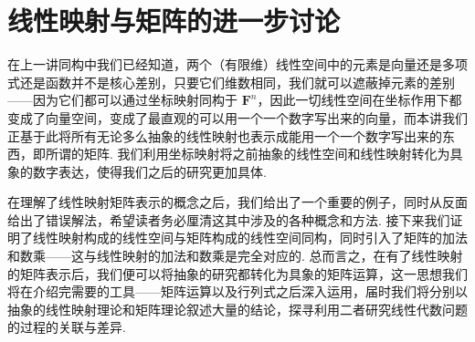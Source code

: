 \section{线性映射与矩阵的进一步讨论}

\begin{summary}

    在上一讲同构中我们已经知道，两个（有限维）线性空间中的元素是向量还是多项式还是函数并不是核心差别，只要它们维数相同，我们就可以遮蔽掉元素的差别——因为它们都可以通过坐标映射同构于 $\mathbf{F}^n$，因此一切线性空间在坐标作用下都变成了向量空间，变成了最直观的可以用一个一个数字写出来的向量，而本讲我们正基于此将所有无论多么抽象的线性映射也表示成能用一个一个数字写出来的东西，即所谓的矩阵. 我们利用坐标映射将之前抽象的线性空间和线性映射转化为具象的数字表达，使得我们之后的研究更加具体.

    在理解了线性映射矩阵表示的概念之后，我们给出了一个重要的例子，同时从反面给出了错误解法，希望读者务必厘清这其中涉及的各种概念和方法. 接下来我们证明了线性映射构成的线性空间与矩阵构成的线性空间同构，同时引入了矩阵的加法和数乘——这与线性映射的加法和数乘是完全对应的. 总而言之，在有了线性映射的矩阵表示后，我们便可以将抽象的研究都转化为具象的矩阵运算，这一思想我们将在介绍完需要的工具——矩阵运算以及行列式之后深入运用，届时我们将分别以抽象的线性映射理论和矩阵理论叙述大量的结论，探寻利用二者研究线性代数问题的过程的关联与差异.

\end{summary}

